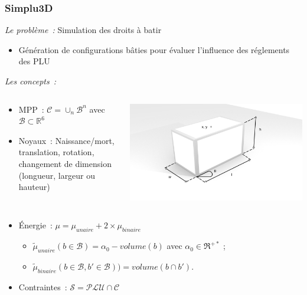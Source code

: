 \documentclass{beamer}
\begin{document}
\begin{frame}
\frametitle{Simplu3D}
\emph{Le probl\`eme~:}  Simulation des droits \`a batir
\begin{itemize}
\item Génération de configurations bâties pour évaluer l'influence des réglements des PLU
\end{itemize}
\emph{Les concepts~:}



\begin{columns}
\begin{column}{0.55\textwidth}
\begin{itemize}
\item MPP~:  $ \mathcal{C} =\cup_{n} \mathcal{B}^n$  avec $\mathcal{B}  \subset  \mathds{R}^{6}$
\item Noyaux~: Naissance/mort, translation, rotation, changement de dimension (longueur, largeur ou hauteur)
\end{itemize}
\end{column}
\begin{column}{0.45\textwidth}
 \includegraphics[width=\textwidth]{boiteFin.png}
\end{column}
\end{columns}
\begin{itemize}
\item Énergie~: $\mu = \mu_{unaire} + 2 \times \mu_{binaire}$
\begin{itemize}
\item $\tilde \mu_{unaire}(b \in \mathcal{B})=\alpha_{0} - volume(b)$ avec $\alpha_{0} \in \Re^{+*}$ ;
\item $\tilde \mu_{binaire}(b \in \mathcal{B}, b' \in \mathcal{B})) = volume(b \cap b')$.
\end{itemize}
\item Contraintes~:  $ \mathcal{S} = \mathcal{PLU} \cap  \mathcal{C}   $
\end{itemize}


\end{frame}
\end{document}
